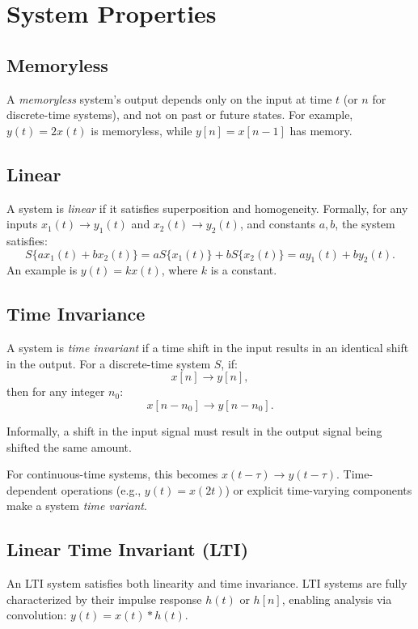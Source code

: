 \section{System Properties}

\subsection{Memoryless}
A \emph{memoryless} system's output depends only on the input at time \( t \) (or \( n \) for discrete-time systems), and not on past or future states. For example, \( y(t) = 2x(t) \) is memoryless, while \( y[n] = x[n-1] \) has memory.

\subsection{Linear}
A system is \emph{linear} if it satisfies superposition and homogeneity. Formally, for any inputs \( x_1(t) \rightarrow y_1(t) \) and \( x_2(t) \rightarrow y_2(t) \), and constants \( a, b \), the system satisfies:
\[
    S\{a x_1(t) + b x_2(t)\} = a S\{x_1(t)\} + b S\{x_2(t)\} = a y_1(t) + b y_2(t).
\]
An example is \( y(t) = kx(t) \), where \( k \) is a constant.

\subsection{Time Invariance}
A system is \emph{time invariant} if a time shift in the input results in an identical shift in the output. For a discrete-time system \( S \), if:
\[
    x[n] \rightarrow y[n],
\]
then for any integer \( n_0 \):
\[
    x[n - n_0] \rightarrow y[n - n_0].
\]

Informally, a shift in the input signal must result in the output signal
being shifted the same amount.

For continuous-time systems, this becomes \( x(t - \tau) \rightarrow y(t - \tau) \). Time-dependent operations (e.g., \( y(t) = x(2t) \)) or explicit time-varying components make a system \emph{time variant}.

\subsection{Linear Time Invariant (LTI)}
An LTI system satisfies both linearity and time invariance. LTI systems are fully characterized by their impulse response \( h(t) \) or \( h[n] \), enabling analysis via convolution: \( y(t) = x(t) * h(t) \).

